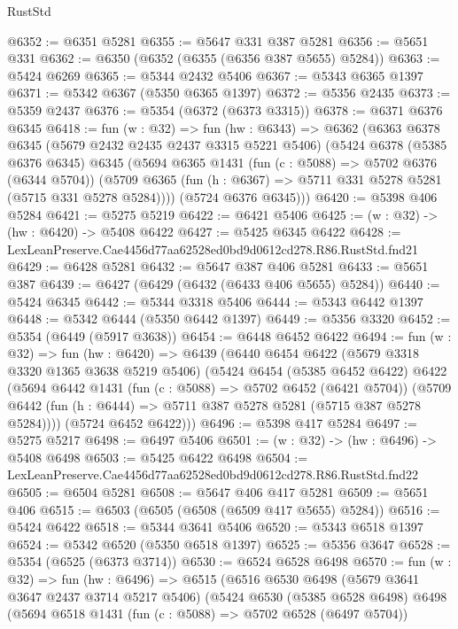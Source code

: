 \begin{lexlean}{RustStd}
\begin{coremodule}
@6352 := @6351 @5281
@6355 := @5647 @331 @387 @5281
@6356 := @5651 @331
@6362 := @6350 (@6352 (@6355 (@6356 @387 @5655) @5284))
@6363 := @5424 @6269
@6365 := @5344 @2432 @5406
@6367 := @5343 @6365 @1397
@6371 := @5342 @6367 (@5350 @6365 @1397)
@6372 := @5356 @2435
@6373 := @5359 @2437
@6376 := @5354 (@6372 (@6373 @3315))
@6378 := @6371 @6376 @6345
@6418 := fun (w : @32) =>
  fun (hw : @6343) =>
  @6362
    (@6363
      @6378
      @6345
      (@5679 @2432 @2435 @2437 @3315 @5221 @5406)
      (@5424
        @6378
        (@5385 @6376 @6345)
        @6345
        (@5694
          @6365
          @1431
          (fun (c : @5088) => @5702 @6376 (@6344 @5704))
          (@5709 @6365 (fun (h : @6367) => @5711 @331 @5278 @5281 (@5715 @331 @5278 @5284))))
        (@5724 @6376 @6345)))
@6420 := @5398 @406 @5284
@6421 := @5275 @5219
@6422 := @6421 @5406
@6425 := (w : @32) -> (hw : @6420) -> @5408 @6422
@6427 := @5425 @6345 @6422
@6428 := LexLeanPreserve.Cae4456d77aa62528ed0bd9d0612cd278.R86.RustStd.fnd21
@6429 := @6428 @5281
@6432 := @5647 @387 @406 @5281
@6433 := @5651 @387
@6439 := @6427 (@6429 (@6432 (@6433 @406 @5655) @5284))
@6440 := @5424 @6345
@6442 := @5344 @3318 @5406
@6444 := @5343 @6442 @1397
@6448 := @5342 @6444 (@5350 @6442 @1397)
@6449 := @5356 @3320
@6452 := @5354 (@6449 (@5917 @3638))
@6454 := @6448 @6452 @6422
@6494 := fun (w : @32) =>
  fun (hw : @6420) =>
  @6439
    (@6440
      @6454
      @6422
      (@5679 @3318 @3320 @1365 @3638 @5219 @5406)
      (@5424
        @6454
        (@5385 @6452 @6422)
        @6422
        (@5694
          @6442
          @1431
          (fun (c : @5088) => @5702 @6452 (@6421 @5704))
          (@5709 @6442 (fun (h : @6444) => @5711 @387 @5278 @5281 (@5715 @387 @5278 @5284))))
        (@5724 @6452 @6422)))
@6496 := @5398 @417 @5284
@6497 := @5275 @5217
@6498 := @6497 @5406
@6501 := (w : @32) -> (hw : @6496) -> @5408 @6498
@6503 := @5425 @6422 @6498
@6504 := LexLeanPreserve.Cae4456d77aa62528ed0bd9d0612cd278.R86.RustStd.fnd22
@6505 := @6504 @5281
@6508 := @5647 @406 @417 @5281
@6509 := @5651 @406
@6515 := @6503 (@6505 (@6508 (@6509 @417 @5655) @5284))
@6516 := @5424 @6422
@6518 := @5344 @3641 @5406
@6520 := @5343 @6518 @1397
@6524 := @5342 @6520 (@5350 @6518 @1397)
@6525 := @5356 @3647
@6528 := @5354 (@6525 (@6373 @3714))
@6530 := @6524 @6528 @6498
@6570 := fun (w : @32) =>
  fun (hw : @6496) =>
  @6515
    (@6516
      @6530
      @6498
      (@5679 @3641 @3647 @2437 @3714 @5217 @5406)
      (@5424
        @6530
        (@5385 @6528 @6498)
        @6498
        (@5694
          @6518
          @1431
          (fun (c : @5088) => @5702 @6528 (@6497 @5704))

\end{coremodule}
\end{lexlean}

